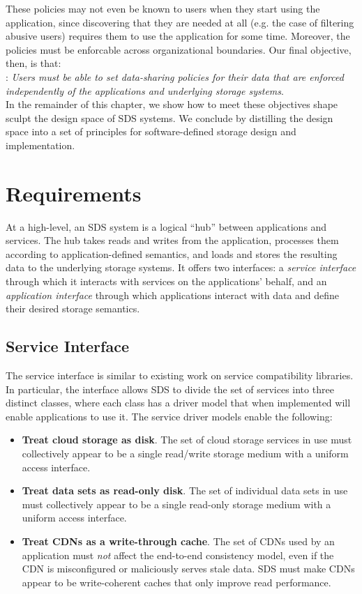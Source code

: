 These policies may not even be known to users when they start using the application, since
discovering that they are needed at all (e.g. the case of filtering
abusive users) requires them to use the application for some time.  Moreover,
the policies must be enforcable across organizational boundaries.
Our final objective, then, is that:
\\
: \emph{Users must be able to set data-sharing policies
for their data that are enforced independently of the applications and underlying storage
systems}.
\\
In the remainder of this chapter, we show how to meet these objectives shape
sculpt the design space of SDS systems.  We
conclude by distilling the design space into a set of principles for
software-defined storage design and implementation.

\section{Requirements}

At a high-level, an SDS system is a logical ``hub'' between applications and
services.  The hub takes reads and writes from the application, processes them
according to application-defined semantics, and loads and stores the resulting
data to the underlying storage systems.
It offers two interfaces:  a \emph{service interface} through which it interacts with
services on the applications' behalf, and an \emph{application interface} through
which applications interact with data and define their desired storage
semantics.

\subsection{Service Interface}

The service interface is similar to existing work on service compatibility
libraries.  In particular, the interface allows SDS to divide the set of
services into three distinct classes, where each class has a driver model that
when implemented will enable applications to use it.  The service driver models
enable the following:

\begin{itemize}
   \item \textbf{Treat cloud storage as disk}.  The set of cloud storage
      services in use must collectively appear to be a single
      read/write storage medium with a uniform access interface.
   \item \textbf{Treat data sets as read-only disk}.  The set of individual
      data sets in use must collectively appear to be a single read-only
      storage medium with a uniform access interface.
   \item \textbf{Treat CDNs as a write-through cache}.  The set of CDNs used by an
      application must \emph{not} affect the end-to-end consistency model, even if the
      CDN is misconfigured or maliciously serves stale data.  SDS must make CDNs
      appear to be write-coherent caches that only improve read performance.
\end{itemize}

